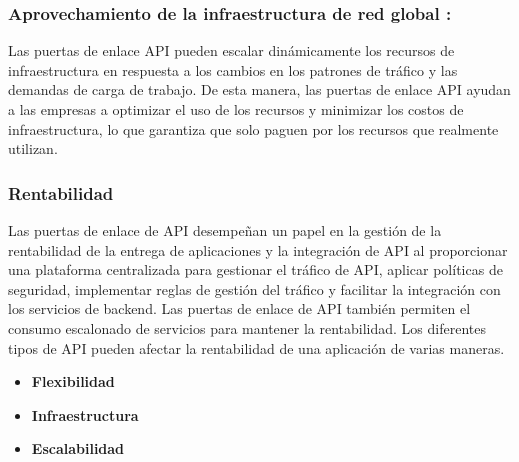 \subsubsection{Aprovechamiento de la infraestructura de red global :}
Las puertas de enlace API pueden escalar dinámicamente los recursos de
infraestructura en respuesta a los cambios en los patrones de tráfico
y las demandas de carga de trabajo. De esta manera, las puertas de
enlace API ayudan a las empresas a optimizar el uso de los recursos
y minimizar los costos de infraestructura, lo que garantiza que
solo paguen por los recursos que realmente utilizan.

\subsubsection{Rentabilidad}
Las puertas de enlace de API desempeñan un papel en la gestión de
la rentabilidad de la entrega de aplicaciones y la integración de
API al proporcionar una plataforma centralizada para gestionar el
tráfico de API, aplicar políticas de seguridad, implementar reglas
de gestión del tráfico y facilitar la integración con los servicios
de backend. Las puertas de enlace de API también permiten el 
consumo escalonado de servicios para mantener la rentabilidad. Los
diferentes tipos de API pueden afectar la rentabilidad de una
aplicación de varias maneras.

\begin{itemize}
  \item {\textbf{Flexibilidad}}
  \item {\textbf{Infraestructura}}
  \item {\textbf{Escalabilidad}}
\end{itemize}